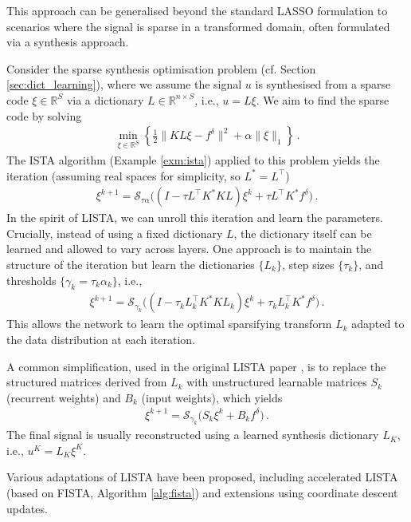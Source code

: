 This approach can be generalised beyond the standard LASSO formulation to scenarios where the signal is sparse in a transformed domain, often formulated via a synthesis approach.

\begin{exm}\label{exm:lista_synthesis}\normalfont
Consider the sparse synthesis optimisation problem (cf. Section \ref{sec:dict_learning}), where we assume the signal $u$ is synthesised from a sparse code $\xi \in \mathbb{R}^S$ via a dictionary $L \in \mathbb{R}^{n \times S}$, i.e., $u = L\xi$. We aim to find the sparse code by solving
\begin{align}
\min_{\xi\in \mathbb{R}^S} \left\{ \frac12 \| K L \xi - f^\delta \|^2 + \alpha \| \xi \|_1 \right\} \, . \label{eq:sparse_synthesis}
\end{align}
The ISTA algorithm (Example \ref{exm:ista}) applied to this problem yields the iteration (assuming real spaces for simplicity, so $L^*=L^\top$)
\begin{align}
\xi^{k+1} = \mathcal{S}_{\tau\alpha} \Big( (I - \tau L^\top K^* K L) \xi^k + \tau L^\top K^* f^\delta \Big) \, . \label{eq:ista_synthesis}
\end{align}
In the spirit of LISTA, we can unroll this iteration and learn the parameters. Crucially, instead of using a fixed dictionary $L$, the dictionary itself can be learned and allowed to vary across layers. One approach is to maintain the structure of the iteration but learn the dictionaries $\{L_k\}$, step sizes $\{\tau_k\}$, and thresholds $\{\gamma_k = \tau_k\alpha_k\}$, i.e.,
\begin{align*}
\xi^{k+1} = \mathcal{S}_{\gamma_k} \Big( (I - \tau_k L_k^\top K^* K L_k) \xi^k + \tau_k L_k^\top K^* f^\delta \Big) \, .
\end{align*}
This allows the network to learn the optimal sparsifying transform $L_k$ adapted to the data distribution at each iteration.

A common simplification, used in the original LISTA paper \cite{gregor2010learning}, is to replace the structured matrices derived from $L_k$ with unstructured learnable matrices $S_k$ (recurrent weights) and $B_k$ (input weights), which yields
\begin{align*}
\xi^{k+1} = \mathcal{S}_{\gamma_k} \Big( S_k \xi^k + B_k f^\delta \Big) \, .
\end{align*}
The final signal is usually reconstructed using a learned synthesis dictionary $L_K$, i.e., $u^K = L_K \xi^K$.
\end{exm}
Various adaptations of LISTA have been proposed, including accelerated LISTA (based on FISTA, Algorithm \ref{alg:fista}) and extensions using coordinate descent updates.

